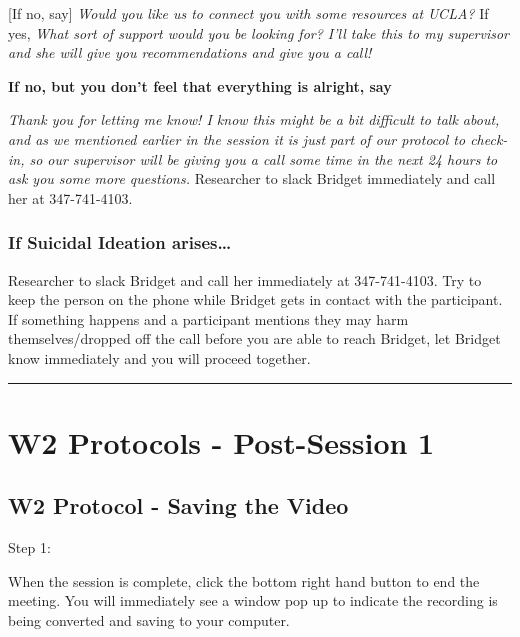 \documentclass[
]{book}
\begin{document}
{[}If no, say{]} \emph{Would you like us to connect you with some resources at UCLA?} If yes, \emph{What sort of support would you be looking for? I'll take this to my supervisor and she will give you recommendations and give you a call!}

\textbf{If no, but you don't feel that everything is alright, say}

\emph{Thank you for letting me know! I know this might be a bit difficult to talk about, and as we mentioned earlier in the session it is just part of our protocol to check-in, so our supervisor will be giving you a call some time in the next 24 hours to ask you some more questions.} Researcher to slack Bridget immediately and call her at 347-741-4103.

\hypertarget{if-suicidal-ideation-arises-1}{%
\subsubsection{If Suicidal Ideation arises\ldots{}}\label{if-suicidal-ideation-arises-1}}

Researcher to slack Bridget and call her immediately at 347-741-4103. Try to keep the person on the phone while Bridget gets in contact with the participant. If something happens and a participant mentions they may harm themselves/dropped off the call before you are able to reach Bridget, let Bridget know immediately and you will proceed together.

\begin{center}\rule{0.5\linewidth}{0.5pt}\end{center}

\hypertarget{w2-protocols---post-session-1}{%
\section{W2 Protocols - Post-Session 1}\label{w2-protocols---post-session-1}}

\hypertarget{w2-protocol---saving-the-video}{%
\subsection{W2 Protocol - Saving the Video}\label{w2-protocol---saving-the-video}}

Step 1:

When the session is complete, click the bottom right hand button to end the meeting. You will immediately see a window pop up to indicate the recording is being converted and saving to your computer.
\end{document}
